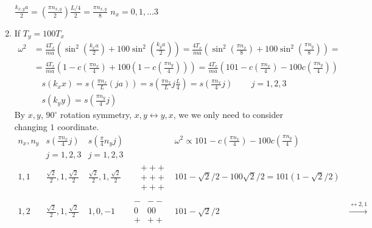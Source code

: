 \documentclass[twoside,10pt]{amsart}
\begin{document}
\begin{enumerate}
$\frac{k_{x,y} a}{2} = \left( \frac{ \pi n_{x,y} }{2} \right) \frac{ L/4}{2} = \frac{ \pi n_{x,y}}{8}$ $n_x = 0,1,\dots 3 $
\item If $T_y = 100 T_x$
\[
\begin{aligned}
  \omega^2 & = \frac{4T_x}{ma} \left( \sin^2{ \left( \frac{k_x a}{2} \right) }+ 100 \sin^2{ \left( \frac{k_y a}{2} \right) } \right) = \frac{ 4T_x}{ma} \left( \sin^2{ \left( \frac{ \pi n_x }{8} \right) } + 100 \sin^2{ \left( \frac{ \pi n_y }{8} \right) } \right) = \\
  & = \frac{4 T_x}{ma} \left( 1 - c\left( \frac{ \pi n_x }{4} \right) + 100 \left( 1 - c\left( \frac{\pi n_y }{4} \right) \right) \right) = \frac{ 4 T_x }{ma} ( 101 - c\left( \frac{ \pi n_x}{4} \right) - 100 c\left( \frac{ \pi n_y}{4} \right) )
\end{aligned}
\]
\[
\begin{aligned}
  & s(k_x x) = s\left( \frac{ \pi n_x }{ L} (ja) \right) = s\left( \frac{ \pi n_x }{L} j \frac{L}{4} \right) = s\left( \frac{ \pi n_x }{4} j \right) \quad \quad \, j = 1,2,3 \\
  & s(k_y y) = s\left( \frac{ \pi n_y}{4} j \right)
\end{aligned}
\]
By $x,y$, $90^{\circ}$ rotation symmetry, $x,y \leftrightarrow y,x$, we we only need to consider changing $1$ coordinate.  
\[
\begin{matrix}
  n_x,n_y & s\left( \frac{ \pi n_x}{4} j \right) & s\left( \frac{ \pi }{4} n_y j \right) & \quad  & \omega^2 \propto 101 - c\left( \frac{ \pi n_x}{4} \right) - 100 c\left( \frac{ \pi n_y }{4} \right) & \quad \\
  \quad & j = 1,2,3 & j=1,2,3 & \quad & \quad & \quad \\
  1,1 & \frac{ \sqrt{2}}{2}, 1 , \frac{ \sqrt{2}}{2} & \frac{ \sqrt{2}}{2}, 1 , \frac{ \sqrt{2}}{2} & \begin{aligned}
    & +++ \\
    & +++ \\
    & +++
\end{aligned} & 101 - \sqrt{2}/2 - 100 \sqrt{2}/2 = 101(1- \sqrt{2}/2) &  \quad \\ 
\quad \\
1,2 & \frac{ \sqrt{2}}{2}, 1 , \frac{ \sqrt{2}}{2} & 1, 0 ,-1  & \begin{aligned}
    -&-- \\
    0&00 \\
    +&++
\end{aligned} & 101 - \sqrt{2}/2  & \xrightarrow{\leftrightarrow 2,1} \begin{aligned}

\end{aligned}
\end{matrix}\]
\end{enumerate}
\end{document}
